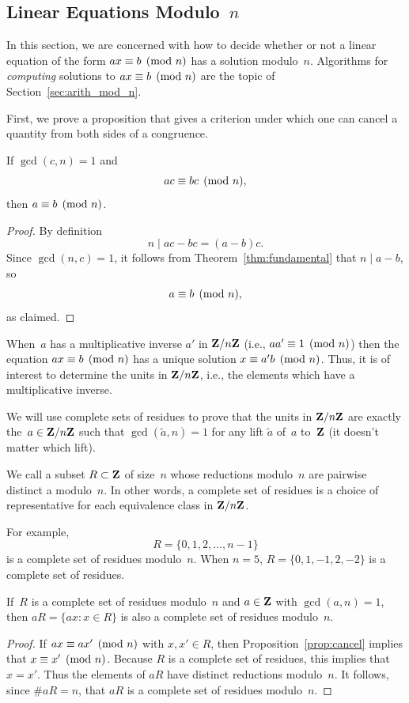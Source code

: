 \subsection{Linear Equations Modulo~$n$}\label{sec:lineq}%
 In this section, we
are concerned with how to decide whether or not a linear equation of
the form $ax\equiv b \pmod{n}$ has a solution modulo~$n$.
Algorithms for {\em computing} solutions to $ax\equiv
b\pmod{n}$ are the topic of Section~\ref{sec:arith_mod_n}.

First, we prove a proposition that gives a criterion under
which one can cancel a quantity from both sides of a congruence.
\begin{proposition}[Cancellation]\label{prop:cancel}
If $\gcd(c,n)=1$ and
$$
   ac\equiv bc\pmod{n},
$$
then $a \equiv b\pmod{n}$.
\end{proposition}
\begin{proof}
By definition
$$
  n \mid ac - bc = (a-b)c.
$$
Since $\gcd(n,c)=1$, it follows
from Theorem~\ref{thm:fundamental} that $n\mid a-b$, so
$$
   a \equiv b\pmod{n},
$$
as claimed.
\end{proof}



When~$a$ has a multiplicative inverse $a'$ in $\mathbf{Z}/n\mathbf{Z}{}$ (i.e.,
$aa'\equiv 1\pmod{n}$) then the equation $ax\equiv b\pmod{n}$ has a unique
solution $x\equiv a'b\pmod{n}$.  Thus, it is of interest to
determine the units in $\mathbf{Z}/n\mathbf{Z}{}$, i.e., the elements which have a
multiplicative inverse.

We will use complete sets of residues
to prove that the units in $\mathbf{Z}/n\mathbf{Z}{}$ are exactly the~$a\in\mathbf{Z}/n\mathbf{Z}{}$
such that $\gcd(\tilde{a},n)=1$ for any lift $\tilde{a}$ of~$a$
to~$\mathbf{Z}$ (it doesn't matter which lift).

\begin{definition}
We call a subset $R\subset\mathbf{Z}$ of size~$n$ whose reductions modulo~$n$ are
pairwise distinct a 
modulo~$n$.  In other words, a complete set of residues is a choice of
representative for each equivalence class in $\mathbf{Z}/n\mathbf{Z}{}$.
\end{definition}
For example,
$$
   R=\{0,1,2,\ldots,n-1\}
$$
is a complete set of residues modulo~$n$.
When $n=5$,
$R = \{0,1,-1,2,-2\}$
is a complete set of residues.

\begin{lemma}\label{lem:residues}
If~$R$ is a complete set of residues modulo~$n$ and $a\in\mathbf{Z}$ with
$\gcd(a,n)=1$, then $aR = \{ax : x \in R\}$
is also a complete set of residues modulo~$n$.
\end{lemma}
\begin{proof}
If $ax\equiv ax'\pmod{n}$ with $x, x'\in R$, then
Proposition~\ref{prop:cancel} implies that $x\equiv{}x'\pmod{n}$.
Because $R$ is a complete set of residues, this implies
that $x=x'$.  Thus the elements of
$aR$ have distinct reductions modulo~$n$.
It follows, since $\#aR=n$, that $aR$ is a
complete set of residues modulo~$n$.
\end{proof}

